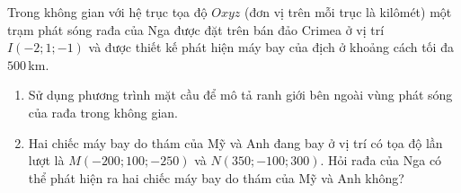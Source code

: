 \begin{bt}%
	Trong không gian với hệ trục tọa độ $Oxyz$ (đơn vị trên mỗi trục là kilômét) một trạm phát sóng rađa của Nga được đặt trên bán đảo Crimea ở vị trí $I(-2;1;-1)$ và được thiết kế phát hiện máy bay của địch ở khoảng cách tối đa $500$\,km.
	\begin{enumerate}
		\item Sử dụng phương trình mặt cầu để mô tả ranh giới bên ngoài vùng phát sóng của rađa trong không gian.
		\item Hai chiếc máy bay do thám của Mỹ và Anh đang bay ở vị trí có tọa độ lần lượt là $M(-200;100;-250)$ và $N(350;-100;300)$. Hỏi rađa của Nga có thể phát hiện ra hai chiếc máy bay do thám của Mỹ và Anh không?
	\end{enumerate}
\end{bt}

